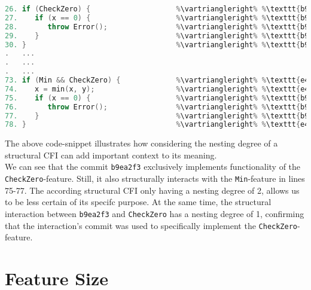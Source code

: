 \begin{lstlisting}[language=C++, caption={Use-Case of Structural CFI's nesting degree}, label=DescriptiveLabel]	
26. if (CheckZero) {                    %\vartriangleright% %\texttt{b9ea2f3}%    %\vartriangleright% %CheckZero%
27.    if (x == 0) {                    %\vartriangleright% %\texttt{b9ea2f3}%    %\vartriangleright% %CheckZero%
28.       throw Error();                %\vartriangleright% %\texttt{b9ea2f3}%    %\vartriangleright% %CheckZero%
29.    }                                %\vartriangleright% %\texttt{b9ea2f3}%    %\vartriangleright% %CheckZero%
30. }                                   %\vartriangleright% %\texttt{b9ea2f3}%    %\vartriangleright% %CheckZero%
.   ...   
.   ...
.   ...
73. if (Min && CheckZero) {             %\vartriangleright% %\texttt{e49c7a1}%    %\vartriangleright% %Min,CheckZero%
74.    x = min(x, y);                   %\vartriangleright% %\texttt{e49c7a1}%    %\vartriangleright% %Min,CheckZero%
75.    if (x == 0) {                    %\vartriangleright% %\texttt{b9ea2f3}%    %\vartriangleright% %Min,CheckZero%
76.       throw Error();                %\vartriangleright% %\texttt{b9ea2f3}%    %\vartriangleright% %Min,CheckZero%
77.    }                                %\vartriangleright% %\texttt{b9ea2f3}%    %\vartriangleright% %Min,CheckZero%
78. }                                   %\vartriangleright% %\texttt{e49c7a1}%    %\vartriangleright% %Min,CheckZero%
\end{lstlisting}
\textsf{The above code-snippet illustrates how considering the nesting degree of a structural CFI can add important context to its meaning. \\ 
We can see that the commit \texttt{b9ea2f3} exclusively implements functionality of the \texttt{CheckZero}-feature. 
Still, it also structurally interacts with the \texttt{Min}-feature in lines 75-77. 
The according structural CFI only having a nesting degree of 2, allows us to be less certain of its specifc purpose. 
At the same time, the structural interaction between \texttt{b9ea2f3} and \texttt{CheckZero} has a nesting degree of 1, confirming that the interaction's commit was used to specifically implement the \texttt{CheckZero}-feature.}

\section{Feature Size}\label{sec:feature_size}

